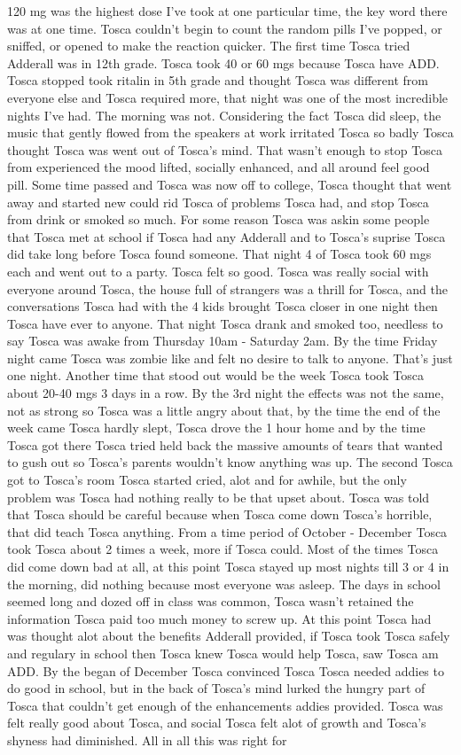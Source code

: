 \documentclass[12pt]{book}
\begin{document}
120 mg was the highest dose I've took at one particular time, the key word there was at one time. Tosca couldn't begin to count the random pills I've popped, or sniffed, or opened to make the reaction quicker. The first time Tosca tried Adderall was in 12th grade. Tosca took 40 or 60 mgs because Tosca have ADD. Tosca stopped took ritalin in 5th grade and thought Tosca was different from everyone else and Tosca required more, that night was one of the most incredible nights I've had. The morning was not. Considering the fact Tosca did sleep, the music that gently flowed from the speakers at work irritated Tosca so badly Tosca thought Tosca was went out of Tosca's mind. That wasn't enough to stop Tosca from experienced the mood lifted, socially enhanced, and all around feel good pill. Some time passed and Tosca was now off to college, Tosca thought that went away and started new could rid Tosca of problems Tosca had, and stop Tosca from drink or smoked so much. For some reason Tosca was askin some people that Tosca met at school if Tosca had any Adderall and to Tosca's suprise Tosca did take long before Tosca found someone. That night 4 of Tosca took 60 mgs each and went out to a party. Tosca felt so good. Tosca was really social with everyone around Tosca, the house full of strangers was a thrill for Tosca, and the conversations Tosca had with the 4 kids brought Tosca closer in one night then Tosca have ever to anyone. That night Tosca drank and smoked too, needless to say Tosca was awake from Thursday 10am - Saturday 2am. By the time Friday night came Tosca was zombie like and felt no desire to talk to anyone. That's just one night. Another time that stood out would be the week Tosca took Tosca about 20-40 mgs 3 days in a row. By the 3rd night the effects was not the same, not as strong so Tosca was a little angry about that, by the time the end of the week came Tosca hardly slept, Tosca drove the 1 hour home and by the time Tosca got there Tosca tried held back the massive amounts of tears that wanted to gush out so Tosca's parents wouldn't know anything was up. The second Tosca got to Tosca's room Tosca started cried, alot and for awhile, but the only problem was Tosca had nothing really to be that upset about. Tosca was told that Tosca should be careful because when Tosca come down Tosca's horrible, that did teach Tosca anything. From a time period of October - December Tosca took Tosca about 2 times a week, more if Tosca could. Most of the times Tosca did come down bad at all, at this point Tosca stayed up most nights till 3 or 4 in the morning, did nothing because most everyone was asleep. The days in school seemed long and dozed off in class was common, Tosca wasn't retained the information Tosca paid too much money to screw up. At this point Tosca had was thought alot about the benefits Adderall provided, if Tosca took Tosca safely and regulary in school then Tosca knew Tosca would help Tosca, saw Tosca am ADD. By the began of December Tosca convinced Tosca Tosca needed addies to do good in school, but in the back of Tosca's mind lurked the hungry part of Tosca that couldn't get enough of the enhancements addies provided. Tosca was felt really good about Tosca, and social Tosca felt alot of growth and Tosca's shyness had diminished. All in all this was right for 
\end{document}
